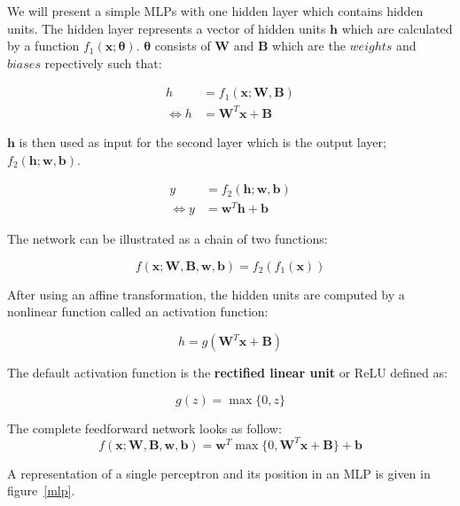 We will present a simple MLPs with one hidden layer which contains hidden units.
The hidden layer represents a vector of hidden units $\bm{h}$ which are
calculated by a function $f_{1}(\bm{x;\theta})$. $\bm{\theta}$ consists of
$\bm{W}$ and $\bm{B}$ which are the $weights$ and $biases$ repectively such
that:

\begin{equation}
  \begin{split}
    h & = f_{1}(\bm{x;W,B}) \\
    \Leftrightarrow h & = \bm{W}^{T}\bm{x}+\bm{B}
  \end{split}
\end{equation}

$\bm{h}$ is then used as input for the second layer which is the output layer;
$f_{2}(\bm{h;w,b})$. 

\begin{equation}
  \begin{split}
    y & = f_{2}(\bm{h;w,b}) \\
    \Leftrightarrow y & = \bm{w}^{T}\bm{h}+\bm{b}
  \end{split}
\end{equation}

The network can be illustrated as a chain of two functions:

\begin{equation} 
  f(\bm{x;W,B,w,b}) = f_{2}(f_{1}(\bm{x}))
\end{equation}

After using an affine transformation, the hidden units are computed by a
nonlinear function called an activation function:

\begin{equation} 
  h = g(\bm{W}^{T}\bm{x+B})
\end{equation}

The default activation function is the \textbf{rectified linear unit} or ReLU
defined as:

\begin{equation} 
  g(z) = \max\{0,z\}
\end{equation}



The complete feedforward network looks as follow:
\begin{equation} 
  f(\bm{x;W,B,w,b}) = \bm{w}^{T}\max\{0,\bm{W}^{T}\bm{x+B}\}+\bm{b}
\end{equation}

A representation of a single perceptron and its position in an MLP is given in
figure~\ref{mlp}.\\

